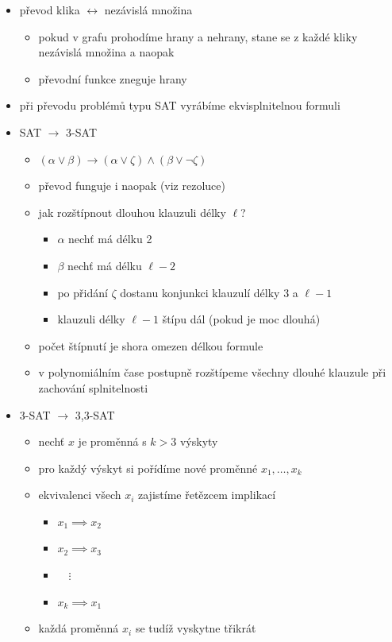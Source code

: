 \begin{itemize}
\begin{itemize}
\begin{itemize}
\begin{itemize}
\end{itemize}
\end{itemize}
\item převod klika $\leftrightarrow$ nezávislá množina
\begin{itemize}
\item pokud v grafu prohodíme hrany a nehrany, stane se z každé kliky nezávislá množina a naopak
\item převodní funkce zneguje hrany
\end{itemize}
\item při převodu problémů typu SAT vyrábíme ekvisplnitelnou formuli
\item SAT $\to$ 3-SAT
\begin{itemize}
\item $(\alpha\lor\beta)\to(\alpha\lor\zeta)\land(\beta\lor\neg\zeta)$
\item převod funguje i naopak (viz rezoluce)
\item jak rozštípnout dlouhou klauzuli délky $\ell$?
\begin{itemize}
\item $\alpha$ nechť má délku 2
\item $\beta$ nechť má délku $\ell-2$
\item po přidání $\zeta$ dostanu konjunkci klauzulí délky 3 a $\ell-1$
\item klauzuli délky $\ell-1$ štípu dál (pokud je moc dlouhá)
\end{itemize}
\item počet štípnutí je shora omezen délkou formule
\item v polynomiálním čase postupně rozštípeme všechny dlouhé klauzule při zachování splnitelnosti
\end{itemize}
\item 3-SAT $\to$ 3,3-SAT
\begin{itemize}
\item nechť $x$ je proměnná s $k\gt 3$ výskyty
\item pro každý výskyt si pořídíme nové proměnné $x_1,\dots,x_k$
\item ekvivalenci všech $x_i$ zajistíme řetězcem implikací
\begin{itemize}
\item $x_1\implies x_2$
\item $x_2\implies x_3$
\item $\quad\vdots$
\item $x_k\implies x_1$
\end{itemize}
\item každá proměnná $x_i$ se tudíž vyskytne třikrát

\end{itemize}
\end{itemize}
\end{itemize}
